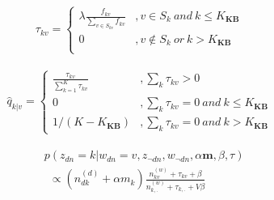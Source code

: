 \documentclass[conference,compsoc]{IEEEtran}
\begin{document}
\begin{scriptsize}
\begin{equation}
\label{eq:wikiPrior}
\begin{aligned}
\tau_{kv}=
\left\{ \begin{aligned}
\lambda \frac{f_{kv}}{\sum_{v\in S_{kv}}f_{kv}} &,v\in S_{k}\ and  \ k \leq K_{\bm{KB}} \\
0&,v \notin S_{k} \ or \ k > K_{\bm{KB}} \\
\end{aligned}\right.
\end{aligned}
\end{equation}
\end{scriptsize}

\begin{scriptsize}
\begin{equation}
\label{eq:initProbability}
\begin{aligned}
\hat{q}_{k|v}=
\left\{ \begin{aligned}
\frac{\tau_{kv}}{\sum_{k=1}^{K}\tau_{kv}} &,\sum_{k}\tau_{kv}>0 \\
0&, \sum_{k}\tau_{kv}=0 \ and \ k \leq K_{\bm{KB}} \\
1/(K-K_{\bm{KB}})&,\sum_{k}\tau_{kv}=0 \ and \ k > K_{\bm{KB}}
\end{aligned}\right.
\end{aligned}
\end{equation}
\end{scriptsize}

\begin{scriptsize}
\begin{equation}
\label{eq:KBPriorLDAgibbs}
\begin{aligned}
&p(z_{dn}=k|w_{dn}=v,z_{\neg{dn}},w_{\neg{dn}},\alpha\bm{m},\beta,\tau)\\
&\ \ \propto (n^{(d)}_{dk}+\alpha m_k)\frac{n^{(w)}_{kv}+\tau_{kv}+\beta}{n^{(w)}_{k,.}+\tau_{k,.}+V\beta}
\end{aligned}
\end{equation}
\end{scriptsize}
\end{document}
